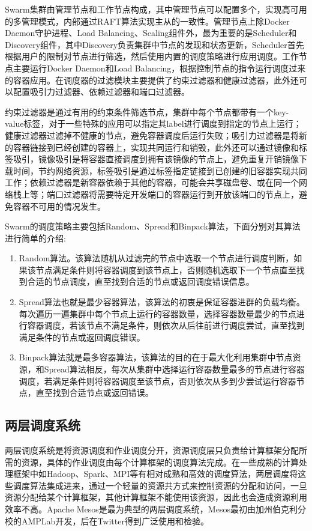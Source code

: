 Swarm集群由管理节点和工作节点构成，其中管理节点可以配置多个，实现高可用的多管理模式，内部通过RAFT算法实现主从的一致性。管理节点上除Docker Daemon守护进程、Load Balancing、Scaling组件外，最为重要的是Scheduler和Discovery组件，其中Discovery负责集群中节点的发现和状态更新，Scheduler首先根据用户的限制对节点进行筛选，然后使用内置的调度策略进行应用调度。工作节点主要运行Docker Daemon和Load Balancing，根据控制节点的指令运行调度过来的容器应用。在调度器的过滤模块主要提供了约束过滤器和健康过滤器，此外还可以配置吸引力过滤器、依赖过滤器和端口过滤器。

约束过滤器是通过有用的约束条件筛选节点，集群中每个节点都带有一个key-value标签，对于一些特殊的应用可以指定其label进行调度到指定的节点上运行；健康过滤器过滤掉不健康的节点，避免容器调度后运行失败；吸引力过滤器是将新的容器链接到已经创建的容器上，实现共同运行和销毁，此外还可以通过镜像和标签吸引，镜像吸引是将容器直接调度到拥有该镜像的节点上，避免重复开销镜像下载时间，节约网络资源，标签吸引是通过标签指定链接到已创建的旧容器实现共同工作；依赖过滤器是新容器依赖于其他的容器，可能会共享磁盘卷、或在同一个网络栈上等；端口过滤器将需要特定开发端口的容器运行到开放该端口的节点上，避免容器不可用的情况发生。

Swarm的调度策略主要包括Random、Spread和Binpack算法，下面分别对其算法进行简单的介绍:
\begin{enumerate}[1.]
	\item Random算法。该算法随机从过滤完的节点中选取一个节点进行调度判断，如果该节点满足条件则将容器调度到该节点上，否则随机选取下一个节点直至找到合适的节点调度，直至找到合适的节点或返回调度错误信息。
	\item Spread算法也就是最少容器算法，该算法的初衷是保证容器进群的负载均衡。每次遍历一遍集群中每个节点上运行的容器数量，选择容器数量最少的节点进行容器调度，若该节点不满足条件，则依次从后往前进行调度尝试，直至找到满足条件的节点或返回调度错误。
	\item Binpack算法就是最多容器算法，该算法的目的在于最大化利用集群中节点资源，和Spread算法相反，每次从集群中选择运行容器数量最多的节点进行容器调度，若满足条件则将容器调度至该节点，否则依次从多到少尝试运行容器节点，直至找到合适节点或返回错误。
\end{enumerate}

\subsection{两层调度系统}
两层调度系统是将资源调度和作业调度分开，资源调度层只负责给计算框架分配所需的资源，具体的作业调度由每个计算框架的调度算法完成。在一些成熟的计算处理框架中如Hadoop、Spark、MPI等有相对成熟和高效的调度算法，两层调度将这些调度算法集成进来，通过一个轻量的资源共方式来控制资源的分配和访问，一旦资源分配给某个计算框架，其他计算框架不能使用该资源，因此也会造成资源利用效率不高。Apache Mesos是最为典型的两层调度系统，Mesos最初由加州伯克利分校的AMPLab开发，后在Twitter得到广泛使用和检验。


